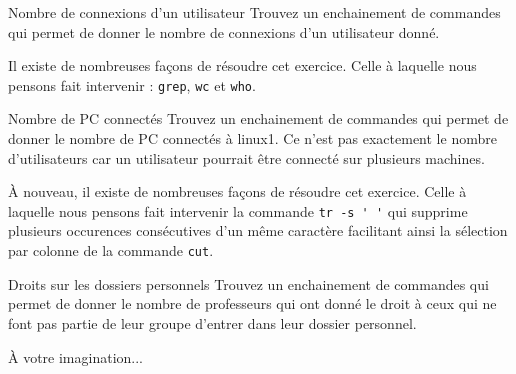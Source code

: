\documentclass[a4paper,11pt]{article}
\begin{document}
\newpage				
			
		\begin{Exercice}{Nombre de connexions d'un utilisateur} 
				Trouvez un enchainement de commandes qui permet de donner le nombre de connexions
				d'un utilisateur donn\'e.
				
            \par
        
				Il existe de nombreuses fa\c cons de r\'esoudre cet exercice. 
				Celle \`a laquelle nous pensons fait intervenir : \verb_grep_, \verb_wc_ et \verb_who_.
				
            \end{Exercice}
        
			
	\begin{Exercice}{Nombre de PC connect\'es} 
			Trouvez un enchainement de commandes qui permet de donner le nombre de PC
			connect\'es \`a linux1. Ce n'est pas exactement le nombre d'utilisateurs car un utilisateur pourrait \^etre connect\'e
			sur plusieurs machines.
				
            \par
        
			\`A nouveau, il existe de nombreuses fa\c cons de r\'esoudre cet exercice. 
			Celle \`a laquelle nous pensons fait intervenir la commande \verb_tr -s ' '_
			qui supprime plusieurs occurences cons\'ecutives d'un m\^eme caract\`ere facilitant ainsi la s\'election par colonne
			de la commande \verb_cut_.
				
            \end{Exercice}
        
			
	\begin{Exercice}{Droits sur les dossiers personnels} 
			Trouvez un enchainement de commandes qui permet de donner le nombre de professeurs
			qui ont donn\'e le droit \`a ceux qui ne font pas partie de leur groupe d'entrer dans leur dossier personnel.
				
            \par
			\`A votre imagination...
				
            \end{Exercice}
   		
				
				
\end{document}
